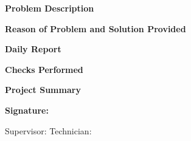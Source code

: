 \documentclass{article}
\begin{document}
\vspace{1em}
\newpage

\begin{center}
    \textbf{Problem Description}
\end{center}

\vspace{1em}

\vspace{1em}

\begin{center}
    \textbf{Reason of Problem and Solution Provided}
\end{center}

\vspace{1em}

\vspace{1em}

\begin{center}
    \textbf{Daily Report}
\end{center}

\vspace{1em}

\vspace{1em}

\begin{center}
    \textbf{Checks Performed}
\end{center}

\vspace{1em}


\vspace{1em}

\begin{center}
    \textbf{Project Summary}
\end{center}

\vspace{1em}

\vspace{1cm}

\noindent \textbf{Signature:}

\vspace{0.5cm}

\noindent Supervisor: \underline{\hspace{5cm}}\hfill Technician: \underline{\hspace{5cm}}
\end{document}
